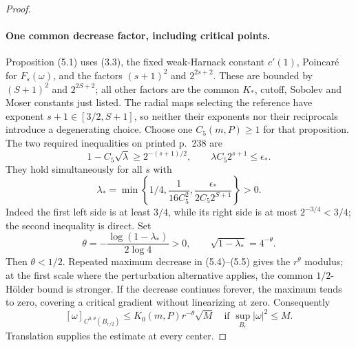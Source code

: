 \begin{proof}
\paragraph{One common decrease factor, including critical points.}
Proposition (5.1) uses (3.3), the fixed weak-Harnack constant
$c'(1)$, Poincar\'e for $F_s(\omega)$, and the factors
$(s+1)^2$ and $2^{2s+2}$. These are bounded by $(S+1)^2$ and
$2^{2S+2}$; all other factors are the common $K_*$, cutoff,
Sobolev and Moser constants just listed. The radial maps selecting
the reference have exponent $s+1\in[3/2,S+1]$, so neither their
exponents nor their reciprocals introduce a degenerating choice.
Choose one $C_5(m,P)\geq1$ for that proposition. The two required
inequalities on printed p.~238 are
\[
 1-C_5\sqrt\lambda\geq2^{-(s+1)/2},\qquad
 \lambda C_5 2^{s+1}\leq\epsilon_*.
\]
They hold simultaneously for all $s$ with
\[
 \lambda_*=\min\left\{1/4,\frac1{16C_5^2},
                       \frac{\epsilon_*}{2C_5 2^{S+1}}\right\}>0.
\]
Indeed the first left side is at least $3/4$, while its right side
is at most $2^{-3/4}<3/4$; the second inequality is direct. Set
\[
 \theta=-\frac{\log(1-\lambda_*)}{2\log4}>0,
 \qquad\sqrt{1-\lambda_*}=4^{-\theta}.
\]
Then $\theta<1/2$. Repeated maximum decrease in (5.4)--(5.5)
gives the $r^\theta$ modulus; at the first scale where the
perturbation alternative applies, the common $1/2$-H\"older bound
is stronger. If the decrease continues forever, the maximum tends
to zero, covering a critical gradient without linearizing at zero.
Consequently
\begin{equation}\label{eq:compact-local-holder}
 [\omega]_{C^{0,\theta}(B_{r/2})}
       \leq K_0(m,P)r^{-\theta}\sqrt M
 \quad\text{if }\sup_{B_r}|\omega|^2\leq M.
\end{equation}
Translation supplies the estimate at every center.


\end{proof}
